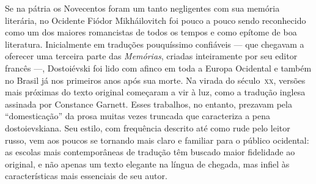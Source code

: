 Se na pátria os Novecentos foram um tanto negligentes com sua memória
literária, no Ocidente Fiódor Mikháilovitch foi pouco a pouco sendo reconhecido
como um dos maiores romancistas de todos os tempos e como epítome de boa
literatura. Inicialmente em traduções pouquíssimo confiáveis --- que chegavam a
oferecer uma terceira parte das \textit{Memórias}, criadas inteiramente por seu
editor francês ---, Dostoiévski foi lido com afinco em toda a Europa Ocidental e
também no Brasil já nos primeiros anos após sua morte. Na virada do século~\textsc{xx},
versões mais próximas do texto original começaram a vir à luz, como a tradução
inglesa assinada por Constance Garnett. Esses trabalhos, no
entanto, prezavam pela “domesticação” da prosa muitas vezes truncada que
caracteriza a pena dostoievskiana. Seu estilo, com frequência descrito até
como rude pelo leitor russo, vem aos poucos se tornando mais claro e familiar
para o público ocidental: as escolas mais contemporâneas de tradução têm
buscado maior fidelidade ao original, e não apenas um texto elegante na
língua de chegada, mas infiel às características mais essenciais de seu autor.




